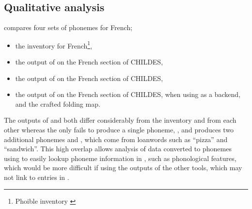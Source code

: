 



\subsection{Qualitative analysis}\label{sec:13-qualitative}


 compares four sets of phonemes for French;
\begin{itemize}
\item the \phoible inventory for French\footnote{Phoible inventory \href{https://phoible.org/inventories/view/2269}{}},
\item the output of  on the French section of CHILDES,
\item the output of  on the French section of CHILDES,
\item the output of \gpp on the French section of CHILDES, when using  as a backend, and the crafted folding map.
\end{itemize}

The outputs of  and  both differ considerably from the \phoible inventory and from each other whereas the \gpp only fails to produce a single phoneme, \ttipa{\textturnh}, and produces two additional phonemes  and , which come from loanwords such as ``pizza'' and ``sandwich''. This high overlap allows analysis of data converted to phonemes using \gpp to easily lookup phoneme information in \phoible, such as phonological features, which would be more difficult if using the outputs of the other tools, which may not link to entries in \phoible.

